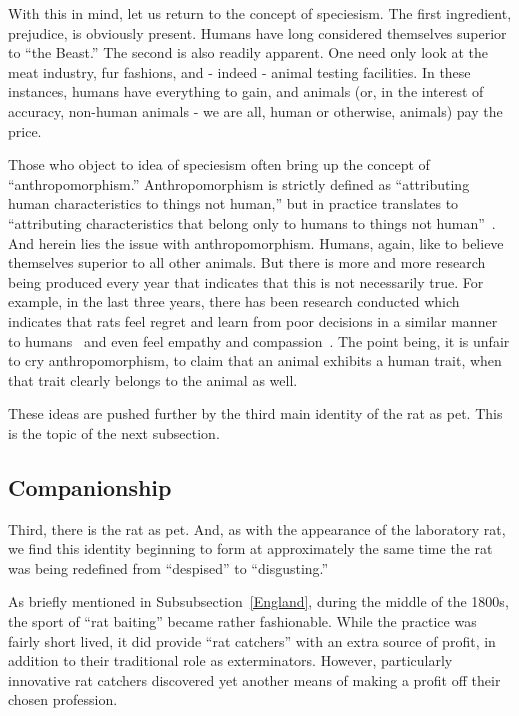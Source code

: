 \documentclass[12pt]{article}
\begin{document}
With this in mind, let us return to the concept of speciesism. The first ingredient, prejudice, is obviously present. Humans have long considered themselves superior to ``the Beast.'' The second is also readily apparent. One need only look at the meat industry, fur fashions, and - indeed - animal testing facilities. In these instances, humans have everything to gain, and animals (or, in the interest of accuracy, non-human animals - we are all, human or otherwise, animals) pay the price.

Those who object to idea of speciesism often bring up the concept of ``anthropomorphism.'' Anthropomorphism is strictly defined as ``attributing human characteristics to things not human,'' but in practice translates to ``attributing characteristics that belong only to humans to things not human''~\cite{Milton2005}. And herein lies the issue with anthropomorphism. Humans, again, like to believe themselves superior to all other animals. But there is more and more research being produced every year that indicates that this is not necessarily true. For example, in the last three years, there has been research conducted which indicates that rats feel regret and learn from poor decisions in a similar manner to humans~\cite{Lewis2013, Lewis2014} and even feel empathy and compassion~\cite{Brown2011}. The point being, it is unfair to cry anthropomorphism, to claim that an animal exhibits a human trait, when that trait clearly belongs to the animal as well.

These ideas are pushed further by the third main identity of the rat as pet. This is the topic of the next subsection.

\subsection{Companionship} \label{Companionship}

Third, there is the rat as pet. And, as with the appearance of the laboratory rat, we find this identity beginning to form at approximately the same time the rat was being redefined from ``despised'' to ``disgusting.''

As briefly mentioned in Subsubsection~\ref{England}, during the middle of the 1800s, the sport of ``rat baiting'' became rather fashionable. While the practice was fairly short lived, it did provide ``rat catchers'' with an extra source of profit, in addition to their traditional role as exterminators. However, particularly innovative rat catchers discovered yet another means of making a profit off their chosen profession.
\end{document}
